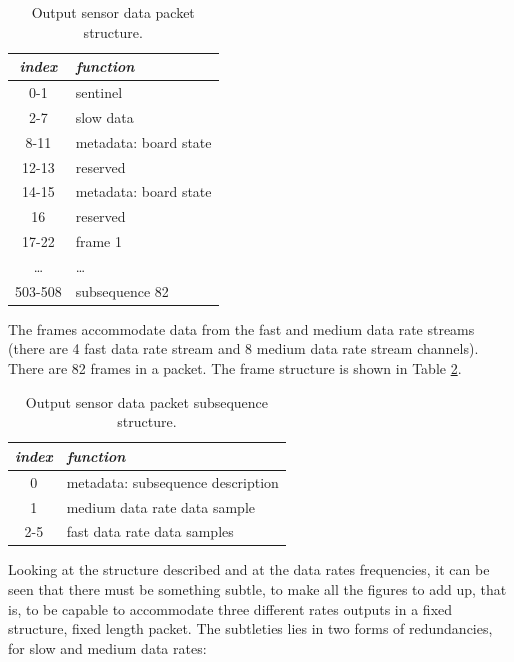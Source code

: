 \documentclass{article} \usepackage{times}
\begin{document}
\begin{table}[htbp]
  \caption{Output sensor data packet structure.}
  \label{tab:data_packet_structure}
  \begin{center}
    \begin{tabular}{|c|l|}\hline
      \textbf{\textit{index}} & \textbf{\textit{function}}\\\hline
      0-1 & sentinel\\\hline
      2-7 & slow data\\\hline
      8-11 & metadata: board state\\\hline
      12-13 & reserved\\\hline
      14-15 & metadata: board state\\\hline
      16 & reserved\\\hline
      17-22 & frame 1\\\hline
      \ldots & \ldots\\\hline
      503-508 & subsequence 82\\\hline
    \end{tabular}
  \end{center}
\end{table}

The frames accommodate data from the fast and medium data rate streams
(there are 4 fast data rate stream and 8 medium data rate stream
channels).  There are 82 frames in a packet.  The frame structure is
shown in Table \ref{tab:subsequence_structure}.

\begin{table}[htbp]
  \caption{Output sensor data packet subsequence structure.}
  \label{tab:subsequence_structure}
  \begin{center}
    \begin{tabular}{|c|l|}\hline
      \textbf{\textit{index}} & \textbf{\textit{function}}\\\hline
      0 & metadata: subsequence description\\\hline
      1 & medium data rate data sample\\\hline
      2-5 & fast data rate data samples\\\hline
    \end{tabular}
  \end{center}
\end{table}

Looking at the structure described and at the data rates frequencies,
it can be seen that there must be something subtle, to make all the
figures to add up, that is, to be capable to accommodate three
different rates outputs in a fixed structure, fixed length packet.
The subtleties lies in two forms of redundancies, for slow and medium
data rates:
\end{document}
